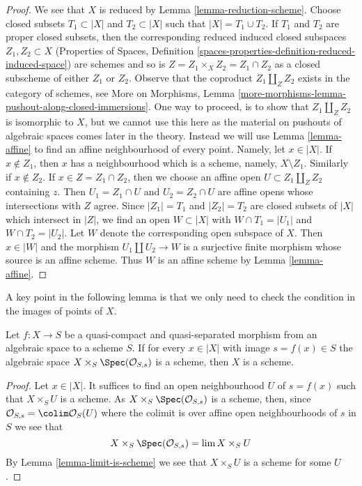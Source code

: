 \begin{proof}
We see that $X$ is reduced by Lemma \ref{lemma-reduction-scheme}.
Choose closed subsets $T_1 \subset |X|$ and $T_2 \subset |X|$ such that
$|X| = T_1 \cup T_2$. If $T_1$ and $T_2$ are proper closed subsets,
then the corresponding reduced induced closed subspaces $Z_1, Z_2 \subset X$
(Properties of Spaces, Definition
\ref{spaces-properties-definition-reduced-induced-space})
are schemes and so is $Z = Z_1 \times_X Z_2 = Z_1 \cap Z_2$ as a closed
subscheme of either $Z_1$ or $Z_2$. Observe that the coproduct
$Z_1 \amalg_Z Z_2$ exists in the category of schemes, see
More on Morphisms, Lemma
\ref{more-morphisms-lemma-pushout-along-closed-immersions}.
One way to proceed, is to show that $Z_1 \amalg_Z Z_2$ is isomorphic to $X$,
but we cannot use this here as the material on pushouts of algebraic
spaces comes later in the theory. Instead we will use
Lemma \ref{lemma-affine} to find an affine neighbourhood of every point.
Namely, let $x \in |X|$. If $x \not \in Z_1$, then $x$ has a neighbourhood
which is a scheme, namely, $X \setminus Z_1$. Similarly if $x \not \in Z_2$.
If $x \in Z = Z_1 \cap Z_2$, then we choose an affine open
$U \subset Z_1 \amalg_Z Z_2$ containing $z$. Then $U_1 = Z_1 \cap U$
and $U_2 = Z_2 \cap U$ are affine opens whose intersections with
$Z$ agree. Since $|Z_1| = T_1$ and $|Z_2| = T_2$ are closed subsets of
$|X|$ which intersect in $|Z|$, we find an open $W \subset |X|$
with $W \cap T_1 = |U_1|$ and $W \cap T_2 = |U_2|$. Let $W$ denote the
corresponding open subspace of $X$. Then $x \in |W|$ and the morphism
$U_1 \amalg U_2 \to W$ is a surjective finite morphism whose source
is an affine scheme. Thus $W$ is an affine scheme by
Lemma \ref{lemma-affine}.
\end{proof}

\noindent
A key point in the following lemma is that we only need to check
the condition in the images of points of $X$.

\begin{lemma}
\label{lemma-enough-local}
Let $f: X \to S$ be a quasi-compact and quasi-separated morphism from an
algebraic space to a scheme $S$. If for every $x \in |X|$ with image
$s = f(x) \in S$ the algebraic space $X \times_S \Spec(\mathcal{O}_{S,s})$
is a scheme, then $X$ is a scheme.
\end{lemma}

\begin{proof}
Let $x \in |X|$. It suffices to find an open neighbourhood $U$ of
$s = f(x)$ such that $X \times_S U$ is a scheme.
As $X \times_S \Spec(\mathcal{O}_{S, s})$ is a scheme, then, since
$\mathcal{O}_{S, s} = \colim \mathcal{O}_S(U)$ where the colimit is
over affine open neighbourhoods of $s$ in $S$ we see that
$$
X \times_S \Spec(\mathcal{O}_{S, s}) = \lim X \times_S U
$$
By Lemma \ref{lemma-limit-is-scheme} we see that $X \times_S U$
is a scheme for some $U$.
\end{proof}

